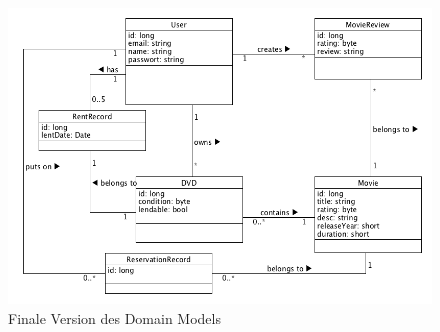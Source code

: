 \begin{figure}[h]
	\centering
	\includegraphics[width=1\textwidth]{img/domain_model2.png}
	\caption{Finale Version des Domain Models}
	\label{fig:domainmodel}
\end{figure}

